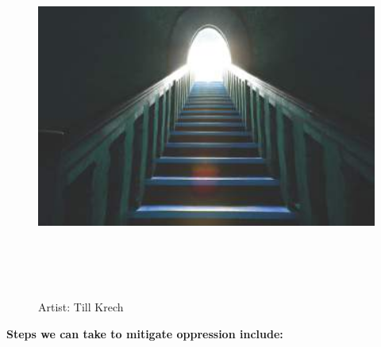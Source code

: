 \begin{figure}[h]
	\centering
	\includegraphics[height=12cm]{TeX_files/4-1.png}
	\caption{Artist: Till Krech}
	\label{2-0}
\end{figure}

\noindent\textcolor{ProcessBlue}{\textbf{\LARGE{Steps we can take to mitigate oppression include:}}}\\

